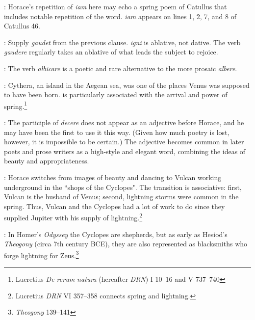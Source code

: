 
: Horace's repetition of \textit{iam} here may echo a spring poem of Catullus that includes notable repetition of the word.  \textit{iam} appears on lines 1, 2, 7, and 8 of Catullus 46.


: Supply \textit{gaudet} from the previous clause.  \textit{igni} is ablative, not dative.  The verb \textit{gaudere} regularly takes an ablative of what leads the subject to rejoice.


: The verb \textit{albicāre} is a poetic and rare alternative to the more prosaic \textit{albēre}.


: Cythera, an island in the Aegean sea, was one of the places Venus was supposed to have been born.\indent{} is particularly associated with the arrival and power of spring.\footnote{Lucretius \textit{De rerum natura} (hereafter \textit{DRN}) I 10--16 and V 737--740}


: The participle of \textit{decēre} does not appear as an adjective before Horace, and he may have been the first to use it this way.  (Given how much poetry is lost, however, it is impossible to be certain.)  The adjective becomes common in later poets and prose writers as a high-style and elegant word, combining the ideas of beauty and appropriateness.


: Horace switches from images of beauty and dancing to Vulcan working underground in the ``shops of the Cyclopes".  The transition is associative: first, Vulcan is the husband of Venus; second, lightning storms were common in the spring.  Thus, Vulcan and the Cyclopes had a lot of work to do since they supplied Jupiter with his supply of lightning.\footnote{Lucretius \textit{DRN} VI 357--358 connects spring and lightning.}


: In Homer's \textit{Odyssey} the Cyclopes are shepherds, but as early as Hesiod's \textit{Theogony} (circa 7th century BCE), they are also represented as blacksmiths who forge lightning for Zeus.\footnote{\textit{Theogony} 139--141}


